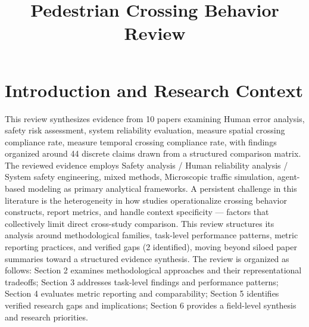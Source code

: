 \documentclass{article}
\title{Pedestrian Crossing Behavior Review}
\begin{document}
\maketitle
\section{Introduction and Research Context}
This review synthesizes evidence from 10 papers examining Human error analysis, safety risk assessment, system reliability evaluation, measure spatial crossing compliance rate, measure temporal crossing compliance rate, with findings organized around 44 discrete claims drawn from a structured comparison matrix. The reviewed evidence employs Safety analysis / Human reliability analysis / System safety engineering, mixed methods, Microscopic traffic simulation, agent-based modeling as primary analytical frameworks. A persistent challenge in this literature is the heterogeneity in how studies operationalize crossing behavior constructs, report metrics, and handle context specificity — factors that collectively limit direct cross-study comparison. This review structures its analysis around methodological families, task-level performance patterns, metric reporting practices, and verified gaps (2 identified), moving beyond siloed paper summaries toward a structured evidence synthesis. The review is organized as follows: Section 2 examines methodological approaches and their representational tradeoffs; Section 3 addresses task-level findings and performance patterns; Section 4 evaluates metric reporting and comparability; Section 5 identifies verified research gaps and implications; Section 6 provides a field-level synthesis and research priorities.
\end{document}
